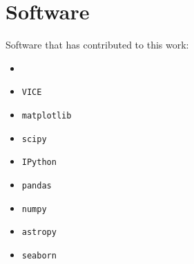 \documentclass[12pt,oneside,letterpaper]{report}
\newcommand{\VICE}{\texttt{VICE}}
\begin{document}
\newpage

\section{Software}

Software that has contributed to this work:

\begin{itemize}
    \item \citet{OhioSupercomputerCenter1987}
    \item \VICE~\citep{JW20, james+21}
    \item \texttt{matplotlib} \citep{matplotlib}
    \item \texttt{scipy} \citep{scipy}
    \item \texttt{IPython} \citep{ipy}
    \item \texttt{pandas} \citep{pandas}
    \item \texttt{numpy} \citep{numpy}
    \item \texttt{astropy} \citep{astropy:2013, astropy:2018, astropy:2022}
    \item \texttt{seaborn}
\end{itemize}




\glsaddall

\printglossary[type=\acronymtype,nonumberlist]
\printglossary[type=symbols,nonumberlist]
\printglossary[type=models]

\printglossary
\end{document}
